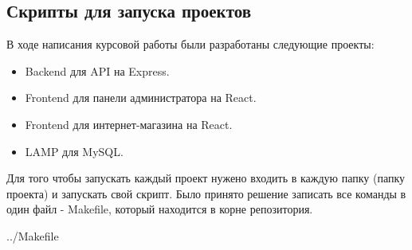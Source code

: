 \newpage

\subsection{Скрипты для запуска проектов}

В ходе написания курсовой работы были разработаны следующие проекты:

\begin{itemize}
    \item Backend для API на Express.
    \item Frontend для панели администратора на React.
    \item Frontend для интернет-магазина на React.
    \item LAMP для MySQL.
\end{itemize}

Для того чтобы запускать каждый проект нужено входить в каждую папку (папку проекта)
и запускать свой скрипт. Было принято решение записать все команды в один файл - Makefile,
который находится в корне репозитория.


    {../Makefile}

\newpage
